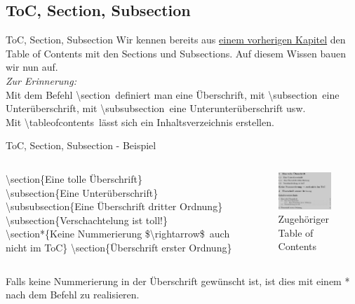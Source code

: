 \subsection{ToC, Section, Subsection}
\begin{frame}{ToC, Section, Subsection}
    Wir kennen bereits aus \hyperlink{sec:toc}{einem vorherigen Kapitel} den Table of Contents mit den Sections und Subsections. Auf diesem Wissen bauen wir nun auf. \\\vspace{3mm}\textit{Zur Erinnerung:}\\Mit dem Befehl \cblue \textbackslash section\black~definiert man eine \"Uberschrift, mit \cblue \textbackslash subsection\black~eine Unter\"uberschrift, mit \cblue \textbackslash subsubsection\black~eine Unterunter\"uberschrift usw.\\\vspace{3mm}
    Mit \cblue \textbackslash tableofcontents\black~l\"asst sich ein Inhaltsverzeichnis erstellen.
\end{frame}
\begin{frame}{ToC, Section, Subsection - Beispiel}
    \begin{columns}
    \begin{column}{.4\textwidth}
    \footnotesize\cblue \textbackslash section\black \{Eine tolle \"Uberschrift\}\\
    \cblue \textbackslash subsection\black\{Eine Unter\"uberschrift\}\\
    \cblue\textbackslash subsubsection\black\{Eine \"Uberschrift dritter Ordnung\}\\
    \cblue\textbackslash subsection\black\{Verschachtelung ist toll!\}\\
    \cblue\textbackslash section*\black\{Keine Nummerierung \cred\$\cblue\textbackslash rightarrow\cred\$\black~auch nicht im ToC\}
    \cblue\textbackslash section\black\{\"Uberschrift erster Ordnung\}
    \end{column}
    \begin{column}{.6\textwidth}
    \begin{figure}
        \centering
        \includegraphics[width=6cm]{images/toc.jpg}
        \caption{Zugeh\"origer Table of Contents}
    \end{figure}
    \end{column}
    \end{columns}
    Falls keine Nummerierung in der \"Uberschrift gew\"unscht ist, ist dies mit einem * nach dem Befehl zu realisieren.
\end{frame}
